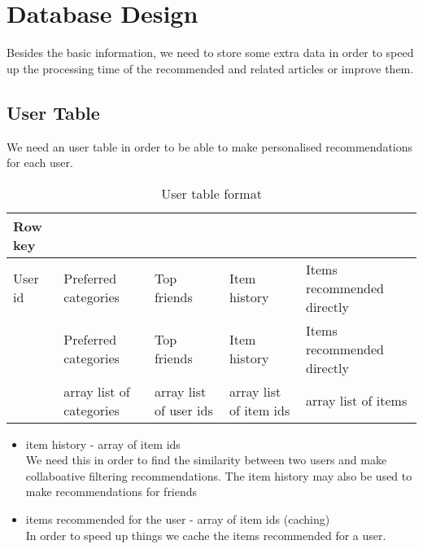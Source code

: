 \section{Database Design}
\label{sec:database-design}
Besides the basic information, we need to store some extra data in order to speed up the processing time of the recommended and related articles or improve them.

\subsection{User Table}
\label{sec:users-table}
We need an user table in order to be able to make personalised recommendations for each user.

\begin{table}[h]
\centering
\caption{User table format}
\label{user-table-format}
\begin{tabular}{@{}lllll@{}}
Row key & & & & \\ \toprule
User id & Preferred categories & Top friends & Item history & Items recommended directly  \\ 
        & Preferred categories & Top friends & Item history & Items recommended directly \\ 
        & array list of categories & array list of user ids & array  list of item ids & array list of items\\ 
\end{tabular}
\end{table}

\begin{itemize}
	\item item history - array of item ids
		\\ We need this in order to find the similarity between two users and make collaboative filtering recommendations.
		The item history may also be used to make recommendations for friends
	\item items recommended for the user - array of item ids (caching)
		\\ In order to speed up things we cache the items recommended for a user.	
\end{itemize}

